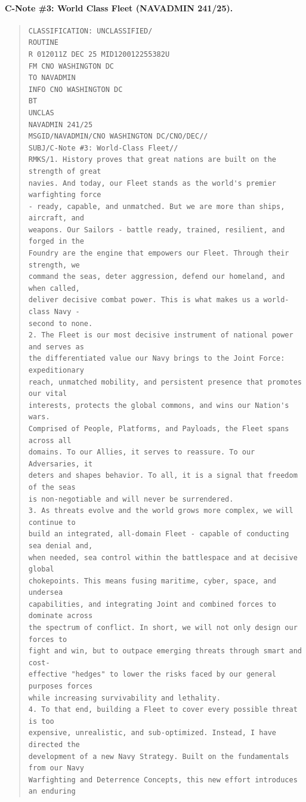 \documentclass[../main.tex]{subfiles}
\begin{document}
\paragraph{C-Note \#3: World Class Fleet (NAVADMIN 241/25).}
\begin{quote}
  \small\begin{verbatim}
CLASSIFICATION: UNCLASSIFIED/
ROUTINE
R 012011Z DEC 25 MID120012255382U
FM CNO WASHINGTON DC
TO NAVADMIN
INFO CNO WASHINGTON DC
BT
UNCLAS
NAVADMIN 241/25
MSGID/NAVADMIN/CNO WASHINGTON DC/CNO/DEC//
SUBJ/C-Note #3: World-Class Fleet//
RMKS/1. History proves that great nations are built on the strength of great
navies. And today, our Fleet stands as the world's premier warfighting force
- ready, capable, and unmatched. But we are more than ships, aircraft, and
weapons. Our Sailors - battle ready, trained, resilient, and forged in the
Foundry are the engine that empowers our Fleet. Through their strength, we
command the seas, deter aggression, defend our homeland, and when called,
deliver decisive combat power. This is what makes us a world-class Navy -
second to none.
2. The Fleet is our most decisive instrument of national power and serves as
the differentiated value our Navy brings to the Joint Force: expeditionary
reach, unmatched mobility, and persistent presence that promotes our vital
interests, protects the global commons, and wins our Nation's wars.
Comprised of People, Platforms, and Payloads, the Fleet spans across all
domains. To our Allies, it serves to reassure. To our Adversaries, it
deters and shapes behavior. To all, it is a signal that freedom of the seas
is non-negotiable and will never be surrendered.
3. As threats evolve and the world grows more complex, we will continue to
build an integrated, all-domain Fleet - capable of conducting sea denial and,
when needed, sea control within the battlespace and at decisive global
chokepoints. This means fusing maritime, cyber, space, and undersea
capabilities, and integrating Joint and combined forces to dominate across
the spectrum of conflict. In short, we will not only design our forces to
fight and win, but to outpace emerging threats through smart and cost-
effective "hedges" to lower the risks faced by our general purposes forces
while increasing survivability and lethality.
4. To that end, building a Fleet to cover every possible threat is too
expensive, unrealistic, and sub-optimized. Instead, I have directed the
development of a new Navy Strategy. Built on the fundamentals from our Navy
Warfighting and Deterrence Concepts, this new effort introduces an enduring

\end{verbatim}
\end{quote}
\end{document}
